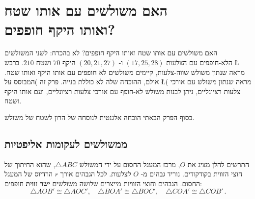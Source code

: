 
\chapter[\R{האם משולשים עם אותו שטח ואותו היקף חופפים?}]{האם משולשים עם אותו שטח\\
ואותו היקף חופפים?}

האם משולשים עם אותו שטח ואותו היקף חופפים? לא בהכרח: לשני המשולשים הלא-חופפים עם הצלעות
$(17,25,28)$
ו-%
$(20,21,27)$
היקף
$70$
ושטח 
$210$.
ברבש
\L{\cite{marita}}
מראה שנתון משולש שווה-צלעות, קיימים משולשים לא חופפים עם אותו היקף ואותו שטח. אולם, ההוכחה שלה לא כוללת בנייה. פרק זה )המבוסס על 
\L{\cite{heron}}(
מראה שנתון משולש עם אורכי צלעות רציונליים, ניתן לבנות משולש לא-חופף עם אורכי צלעות רציונליים, ועם אותו היקף ושטח.

בסוף הפרק הבאתי הוכחה אלגנטית לנוסחה של הרון לשטח של משולש.


\section{%
ממשולשים לעקומות אליפטיות%
}

התרשים להלן מציג את 
$O$, 
מרכז המעגל החסום על ידי המשולש
$\triangle ABC$, 
שהוא החיתוך של חוצי הזווית בקודקודים. נוריד גבהים מ-%
$O$
לצלעות. לכל הגבהים אורך
$r$
הרדיוס של המעגל החסום. הגבהים וחוצי הזוויות מייצרים שלושה משולשים
\textbf{ישר זווית}
חופפים:
\[
\triangle AOB'\cong \triangle AOC',\quad \triangle BOA'\cong \triangle BOC', \quad \triangle COA'\cong \triangle COB'\,.
\]

\vspace{-12ex}

